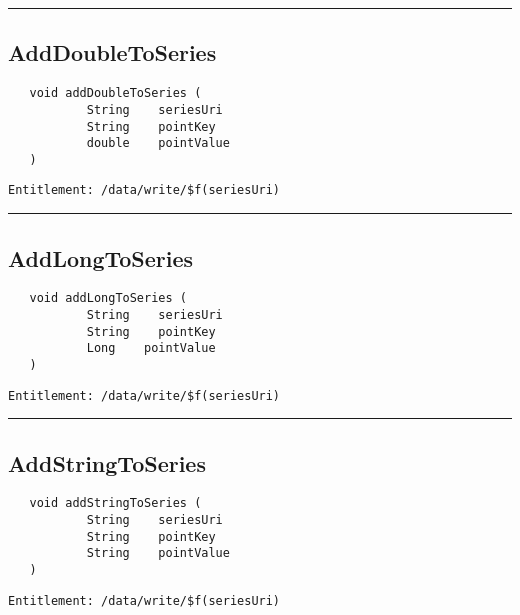 \rule{12cm}{2pt}
\subsection{AddDoubleToSeries}
\label{Api:AddDoubleToSeries}
\begin{Verbatim}
   void addDoubleToSeries (
           String    seriesUri
           String    pointKey
           double    pointValue
   )
\end{Verbatim}
\begin{Verbatim}[formatcom=\color{Maroon}]
  Entitlement: /data/write/$f(seriesUri)
\end{Verbatim}



\rule{12cm}{2pt}
\subsection{AddLongToSeries}
\label{Api:AddLongToSeries}
\begin{Verbatim}
   void addLongToSeries (
           String    seriesUri
           String    pointKey
           Long    pointValue
   )
\end{Verbatim}
\begin{Verbatim}[formatcom=\color{Maroon}]
  Entitlement: /data/write/$f(seriesUri)
\end{Verbatim}



\rule{12cm}{2pt}
\subsection{AddStringToSeries}
\label{Api:AddStringToSeries}
\begin{Verbatim}
   void addStringToSeries (
           String    seriesUri
           String    pointKey
           String    pointValue
   )
\end{Verbatim}
\begin{Verbatim}[formatcom=\color{Maroon}]
  Entitlement: /data/write/$f(seriesUri)
\end{Verbatim}



